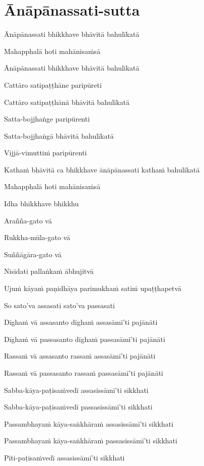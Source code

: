 \section{Ānāpānassati-sutta}


\begin{leader}
\end{leader}

{\fontsize{9.5}{13}\selectfont

Ānāpānassati bhikkhave bhāvitā bahulīkatā

Mahapphalā hoti mahānisaṁsā

Ānāpānassati bhikkhave bhāvitā bahulīkatā

Cattāro satipaṭṭhāne paripūreti

Cattāro satipaṭṭhānā bhāvitā bahulīkatā

Satta-bojjhaṅge paripūrenti

Satta-bojjhaṅgā bhāvitā bahulīkatā

Vijjā-vimuttiṁ paripūrenti

Kathaṁ bhāvitā ca bhikkhave ānāpānassati kathaṁ bahulīkatā

Mahapphalā hoti mahānisaṁsā

Idha bhikkhave bhikkhu

Arañña-gato vā

Rukkha-mūla-gato vā

Suññāgāra-gato vā

Nisīdati pallaṅkaṁ ābhujitvā

Ujuṁ kāyaṁ paṇidhāya parimukhaṁ satiṁ upaṭṭhapetvā

So sato'va assasati sato'va passasati

Dīghaṁ vā assasanto dīghaṁ assasāmī'ti pajānāti

Dīghaṁ vā passasanto dīghaṁ passasāmī'ti pajānāti

Rassaṁ vā assasanto rassaṁ assasāmī'ti pajānāti

Rassaṁ vā passasanto rassaṁ passasāmī'ti pajānāti

Sabba-kāya-paṭisaṁvedī assasissāmī'ti sikkhati

Sabba-kāya-paṭisaṁvedī passasissāmī'ti sikkhati

Passambhayaṁ kāya-saṅkhāraṁ assasissāmī'ti sikkhati

Passambhayaṁ kāya-saṅkhāraṁ passasissāmī'ti sikkhati

Pīti-paṭisaṁvedī assasissāmī'ti sikkhati

}

